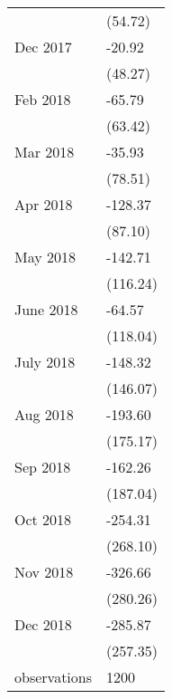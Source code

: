\begin{tabular}{ll}
                &      (54.72) \\
Dec 2017        &       -20.92 \\
                &      (48.27) \\
Feb 2018        &       -65.79 \\
                &      (63.42) \\
Mar 2018        &       -35.93 \\
                &      (78.51) \\
Apr 2018        &      -128.37 \\
                &      (87.10) \\
May 2018        &      -142.71 \\
                &     (116.24) \\
June 2018       &       -64.57 \\
                &     (118.04) \\
July 2018       &      -148.32 \\
                &     (146.07) \\
Aug 2018        &      -193.60 \\
                &     (175.17) \\
Sep 2018        &      -162.26 \\
                &     (187.04) \\
Oct 2018        &      -254.31 \\
                &     (268.10) \\
Nov 2018        &      -326.66 \\
                &     (280.26) \\
Dec 2018        &      -285.87 \\
                &     (257.35) \\
observations    &         1200 \\
\bottomrule
\end{tabular}
